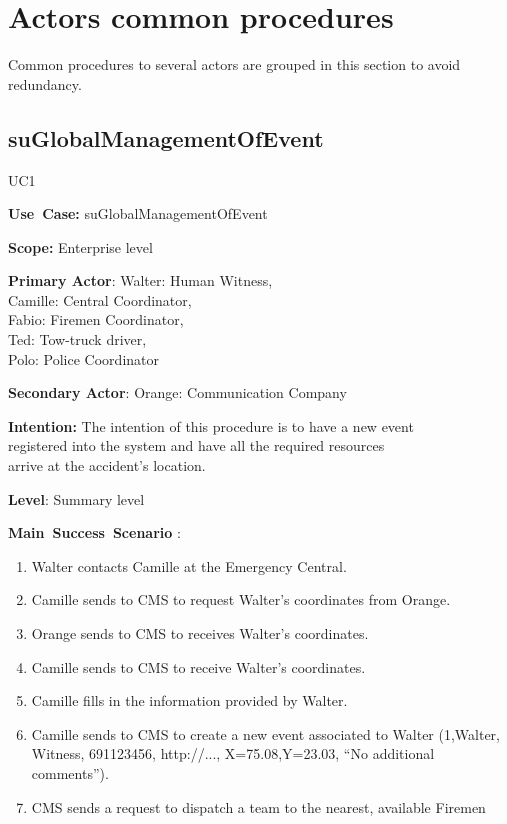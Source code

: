 \section{Actors common procedures}
Common procedures to several actors are grouped in this section to avoid
redundancy.

\subsection{suGlobalManagementOfEvent}
\begin{lyxlist}{UC1}
\small{
\item [\textbf{Use~Case:}] suGlobalManagementOfEvent
\item [\textbf{Scope:}] Enterprise level
\item [\textbf{Primary Actor}:] Walter: Human Witness,\\ 
						        Camille: Central Coordinator,\\
								Fabio: Firemen Coordinator,\\
								Ted: Tow-truck driver,\\ 
								Polo: Police Coordinator
\item [\textbf{Secondary Actor}:] Orange: Communication Company
\item [\textbf{Intention:}] The intention of this procedure is to have a new
event\\ registered into the system and have all the required resources\\ arrive
at the accident’s location.
\item [\textbf{Level}:] Summary level
\item [\textbf{Main~Success~Scenario}]:
\begin{enumerate}
  \item Walter contacts Camille at the Emergency Central.
  \item Camille sends to CMS to request Walter’s coordinates from Orange.
  \item Orange sends to CMS to receives Walter’s coordinates.
  \item Camille sends to CMS to receive Walter’s coordinates.
  \item Camille fills in the information provided by Walter.
  \item Camille sends to CMS to create a new event associated to Walter
  (1,Walter, Witness, 691123456, http://..., X=75.08,Y=23.03, ``No additional 
  comments'').
  \item CMS sends a request to dispatch a team to the nearest, available Firemen

\end{enumerate}}
\end{lyxlist}
